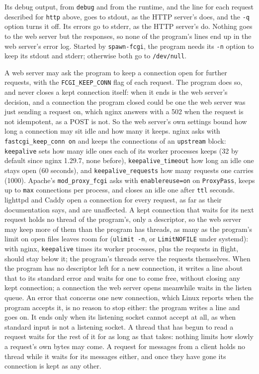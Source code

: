 \documentclass{article}
\newcommand{\cd}[1]{\texttt{#1}}
\begin{document}
\begin{itemize}
\begin{itemize}
    Its debug output, from \cd{debug} and from the runtime, and the line for each request described for \texttt{http} above, goes to stdout, as the HTTP server's does, and the \texttt{-q} option turns it off.  Its errors go to stderr, as the HTTP server's do.  Nothing goes to the web server but the responses, so none of the program's lines end up in the web server's error log.  Started by \texttt{spawn-fcgi}, the program needs its \texttt{-n} option to keep its stdout and stderr; otherwise both go to \texttt{/dev/null}.

    A web server may ask the program to keep a connection open for further requests, with the \texttt{FCGI\_KEEP\_CONN} flag of each request.  The program does so, and never closes a kept connection itself: when it ends is the web server's decision, and a connection the program closed could be one the web server was just sending a request on, which nginx answers with a 502 when the request is not idempotent, as a POST is not.  So the web server's own settings bound how long a connection may sit idle and how many it keeps.  nginx asks with \texttt{fastcgi\_keep\_conn on} and keeps the connections of an \texttt{upstream} block: \texttt{keepalive} sets how many idle ones each of its worker processes keeps (32 by default since nginx 1.29.7, none before), \texttt{keepalive\_timeout} how long an idle one stays open (60 seconds), and \texttt{keepalive\_requests} how many requests one carries (1000).  Apache's \texttt{mod\_proxy\_fcgi} asks with \texttt{enablereuse=on} on \texttt{ProxyPass}, keeps up to \texttt{max} connections per process, and closes an idle one after \texttt{ttl} seconds.  lighttpd and Caddy open a connection for every request, as far as their documentation says, and are unaffected.  A kept connection that waits for its next request holds no thread of the program's, only a descriptor, so the web server may keep more of them than the program has threads, as many as the program's limit on open files leaves room for (\texttt{ulimit -n}, or \texttt{LimitNOFILE} under systemd): with nginx, \texttt{keepalive} times its worker processes, plus the requests in flight, should stay below it; the program's threads serve the requests themselves.  When the program has no descriptor left for a new connection, it writes a line about that to its standard error and waits for one to come free, without closing any kept connection; a connection the web server opens meanwhile waits in the listen queue.  An error that concerns one new connection, which Linux reports when the program accepts it, is no reason to stop either: the program writes a line and goes on.  It ends only when its listening socket cannot accept at all, as when standard input is not a listening socket.  A thread that has begun to read a request waits for the rest of it for as long as that takes: nothing limits how slowly a request's own bytes may come.  A request for messages from a client holds no thread while it waits for its messages either, and once they have gone its connection is kept as any other.


\end{itemize}
\end{itemize}
\end{document}
